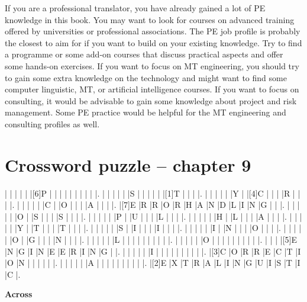 If you are a professional translator, you have already gained a lot of PE knowledge in this book. You may want to look for courses on advanced training offered by universities or professional associations. The PE job profile is probably the closest to aim for if you want to build on your existing knowledge. Try to find a programme or some add-on courses that discuss practical aspects and offer some hands-on exercises. If you want to focus on MT engineering, you should try to gain some extra knowledge on the technology and might want to find some computer linguistic, MT, or artificial intelligence courses. If you want to focus on consulting, it would be advisable to gain some knowledge about project and risk management. Some PE practice would be helpful for the MT engineering and consulting profiles as well.

\newpage

\section*{Crossword puzzle -- chapter 9}

\begin{Puzzle}{15}{19}
|{}	|{}	|{}	|{}	|{}	|[6]P	|{}	|{}	|{}	|{}	|{}	|{}	|{}	|{}	|{}	|.
|{}	|{}	|{}	|{}	|{}	|S	|{}	|{}	|{}	|{}	|{}	|[1]T	|{}	|{}	|{}	|.
|{}	|{}	|{}	|{}	|{}	|Y	|{}	|[4]C	|{}	|{}	|{}	|R	|{}	|{}	|{}	|.
|{}	|{}	|{}	|{}	|{}	|C	|{}	|O	|{}	|{}	|{}	|A	|{}	|{}	|{}	|.
|[7]E	|R	|R	|O	|R	|H	|A	|N	|D	|L	|I	|N	|G	|{}	|{}	|.
|{}	|{}	|{}	|{}	|{}	|O	|{}	|S	|{}	|{}	|{}	|S	|{}	|{}	|{}	|.
|{}	|{}	|{}	|{}	|{}	|P	|{}	|U	|{}	|{}	|{}	|L	|{}	|{}	|{}	|.
|{}	|{}	|{}	|{}	|{}	|H	|{}	|L	|{}	|{}	|{}	|A	|{}	|{}	|{}	|.
|{}	|{}	|{}	|{}	|{}	|Y	|{}	|T	|{}	|{}	|{}	|T	|{}	|{}	|{}	|.
|{}	|{}	|{}	|{}	|{}	|S	|{}	|I	|{}	|{}	|{}	|I	|{}	|{}	|{}	|.
|{}	|{}	|{}	|{}	|{}	|I	|{}	|N	|{}	|{}	|{}	|O	|{}	|{}	|{}	|.
|{}	|{}	|{}	|{}	|{}	|O	|{}	|G	|{}	|{}	|{}	|N	|{}	|{}	|{}	|.
|{}	|{}	|{}	|{}	|{}	|L	|{}	|{}	|{}	|{}	|{}	|{}	|{}	|{}	|{}	|.
|{}	|{}	|{}	|{}	|{}	|O	|{}	|{}	|{}	|{}	|{}	|{}	|{}	|{}	|{}	|.
|{}	|{}	|{}	|[5]E	|N	|G	|I	|N	|E	|E	|R	|I	|N	|G	|{}	|.
|{}	|{}	|{}	|{}	|{}	|I	|{}	|{}	|{}	|{}	|{}	|{}	|{}	|{}	|{}	|.
|[3]C	|O	|R	|R	|E	|C	|T	|I	|O	|N	|{}	|{}	|{}	|{}	|{}	|.
|{}	|{}	|{}	|{}	|{}	|A	|{}	|{}	|{}	|{}	|{}	|{}	|{}	|{}	|{}	|.
|[2]E	|X	|T	|R	|A	|L	|I	|N	|G	|U	|I	|S	|T	|I	|C	|.
\end{Puzzle}

\begin{PuzzleClues}{\textbf{Across}}
\end{PuzzleClues}

